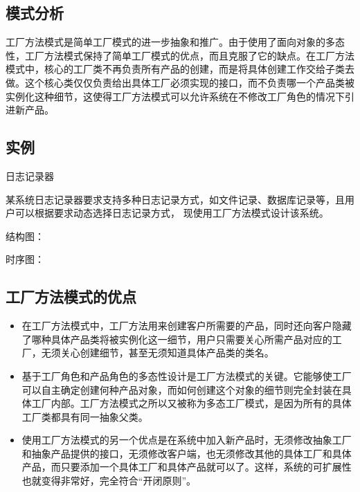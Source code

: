 \documentclass[letterpaper,10pt,english]{sphinxmanual}
\begin{document}
\subsection{模式分析}
\label{\detokenize{creational_patterns/factory_method:id7}}
\sphinxAtStartPar
工厂方法模式是简单工厂模式的进一步抽象和推广。由于使用了面向对象的多态性，工厂方法模式保持了简单工厂模式的优点，而且克服了它的缺点。在工厂方法模式中，核心的工厂类不再负责所有产品的创建，而是将具体创建工作交给子类去做。这个核心类仅仅负责给出具体工厂必须实现的接口，而不负责哪一个产品类被实例化这种细节，这使得工厂方法模式可以允许系统在不修改工厂角色的情况下引进新产品。


\subsection{实例}
\label{\detokenize{creational_patterns/factory_method:id8}}
\sphinxAtStartPar
日志记录器

\sphinxAtStartPar
某系统日志记录器要求支持多种日志记录方式，如文件记录、数据库记录等，且用户可以根据要求动态选择日志记录方式，
现使用工厂方法模式设计该系统。

\sphinxAtStartPar
结构图：

\noindent{}

\sphinxAtStartPar
时序图：

\noindent{}


\subsection{工厂方法模式的优点}
\label{\detokenize{creational_patterns/factory_method:id9}}\begin{itemize}
\item {} 
\sphinxAtStartPar
在工厂方法模式中，工厂方法用来创建客户所需要的产品，同时还向客户隐藏了哪种具体产品类将被实例化这一细节，用户只需要关心所需产品对应的工厂，无须关心创建细节，甚至无须知道具体产品类的类名。

\item {} 
\sphinxAtStartPar
基于工厂角色和产品角色的多态性设计是工厂方法模式的关键。它能够使工厂可以自主确定创建何种产品对象，而如何创建这个对象的细节则完全封装在具体工厂内部。工厂方法模式之所以又被称为多态工厂模式，是因为所有的具体工厂类都具有同一抽象父类。

\item {} 
\sphinxAtStartPar
使用工厂方法模式的另一个优点是在系统中加入新产品时，无须修改抽象工厂和抽象产品提供的接口，无须修改客户端，也无须修改其他的具体工厂和具体产品，而只要添加一个具体工厂和具体产品就可以了。这样，系统的可扩展性也就变得非常好，完全符合“开闭原则”。

\end{itemize}
\end{document}
